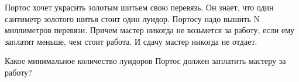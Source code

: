 Портос хочет украсить золотым шитьем свою перевязь. Он знает, что один сантиметр золотого шитья стоит один луидор. Портосу надо вышить N миллиметров перевязи. Причем мастер никогда не возьмется за работу, если ему заплатят меньше, чем стоит работа. И сдачу мастер никогда не отдает.

Какое минимальное количество луидоров Портос должен заплатить мастеру за работу?